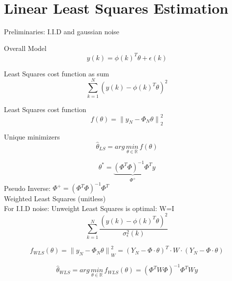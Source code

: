 \section*{Linear Least Squares Estimation}
Preliminaries: I.I.D and gaussian noise

Overall Model
\begin{equation*}
y(k)={ \phi (k) }^{ T }\theta +\epsilon (k)
\end{equation*}

Least Squares cost function as sum
\begin{equation*}
\sum _{ k=1 }^{ N }{{ (y(k)-{ \phi (k) }^{ T }\theta )}^{2  } } 
\end{equation*}

Least Squares cost function
\begin{equation*}
f(\theta )={ \parallel {y  }_{N  }-{ \Phi }_{ N }\theta\parallel }_{ 2 }^{2  }
\end{equation*}

Unique minimizers
\begin{equation*}
\hat{\theta}_{LS} =arg \, \underset{ \theta \in \mathbb{R} }{ min } \, f(\theta)
\end{equation*}

\begin{equation*}
{ \theta  }^{ * }=\underbrace { { ({ \Phi  }^{ T }\Phi ) }^{ -1 }{ \Phi  }^{ T } }_{ { \Phi  }^{ + } } y
\end{equation*}
Pseudo Inverse: \qquad $\Phi ^{ + }={({ \Phi  }^{ T }\Phi ) }^{ -1 }{ \Phi  }^{ T }$\\

Weighted Least Squares (unitless)\\
For I.I.D noise: Unweight Least Squares is optimal: W=I
\begin{equation*}
\sum _{ k=1 }^{ N }\frac {{{ (y(k)-{ \phi (k) }^{ T }\theta )}^{2  } }}{\sigma_{\epsilon}^{2}(k)}
\end{equation*}


\begin{equation*}
{ f }_{ WLS }(\theta )={ \parallel { y }_{ N }-{ \Phi  }_{ N }\theta \parallel  }_{ W }^{ 2 }={ ({ Y }_{ N }-\Phi \cdot \theta ) }^{ T }\cdot W\cdot  ({ Y }_{ N }-\Phi \cdot \theta )
\end{equation*}




\begin{equation*}
{ \hat{\theta} }_{ WLS }=arg\, \underset{ \theta \in \mathbb{R} }{ min }\,{f  }_{WLS  }(\theta)={ ({\Phi}^{T}W\Phi) }^{ -1 }{\Phi}^{T} Wy
\end{equation*}


